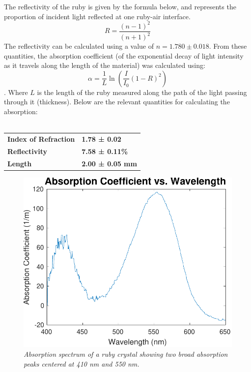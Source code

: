 \documentclass[11pt, a4paper, twocolumn]{article}
\begin{document}
The reflectivity of the ruby is given by the formula below, and represents the proportion of incident light reflected at one ruby-air interface.
$$R=\frac{(n-1)^2}{(n+1)^2}$$
The reflectivity can be calculated using a value of $n = 1.780 \pm 0.018$. From these quantities, the absorption coefficient (of the exponential decay of light intensity as it travels along the length of the material) was calculated using:
$$ \alpha = \frac{1}{L}\ln(\frac{I}{I_0}(1-R)^2)$$.
Where $L$ is the length of the ruby measured along the path of the light passing through it (thickness). Below are the relevant quantities for calculating the absorption:
\\\\
\begin{tabular}{ll}
\textbf{Index of Refraction} & \textbf{1.78 ± 0.02}    \\
\textbf{Reflectivity}        & \textbf{7.58 ± 0.11\%}  \\
\textbf{Length}              & \textbf{2.00 ± 0.05 mm}  
\end{tabular}

\begin{figure}[]
\includegraphics[width=\linewidth]{absorptionSpectrumFocused.pdf}
\caption{\textit{Absorption spectrum of a ruby crystal showing two broad absorption peaks centered at 410 nm and 550 nm.}}
\label{fig:intensities}
\end{figure}
\end{document}

